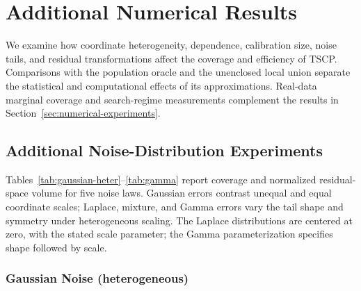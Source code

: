 
\begingroup
\color{blue}
\setlength{\emergencystretch}{2em}

\section{Additional Numerical Results}
\label{app:additional-experiments}

We examine how coordinate heterogeneity, dependence, calibration size, noise
tails, and residual transformations affect the coverage and efficiency of
TSCP. Comparisons with the population oracle and the unenclosed local union
separate the statistical and computational effects of its approximations.
Real-data marginal coverage and search-regime measurements complement the
results in Section~\ref{sec:numerical-experiments}.

\subsection{Additional Noise-Distribution Experiments}
\label{app:additional-distribution-experiments}
\label{app:simulations}

Tables~\ref{tab:gaussian-heter}--\ref{tab:gamma} report coverage and
normalized residual-space volume for five noise laws. Gaussian errors
contrast unequal and equal coordinate scales; Laplace, mixture, and Gamma
errors vary the tail shape and symmetry under heterogeneous scaling.
The Laplace distributions are centered at zero, with the stated scale
parameter; the Gamma parameterization specifies shape followed by scale.

\subsubsection*{Gaussian Noise (heterogeneous)}

\begin{table}[H]
    \centering
    
    \caption{Performance of the proposed TSCP method and alternative conformal prediction approaches on simulated data with $d=10$ outcome variables, as in Figure~\ref{fig:gaussian-heter}. All results are averaged over $200$ trials with their one standard deviation reported in parenthesis.  
    The target coverage level is $0.9$. Coverage below this target is highlighted in \textcolor{red}{red}. For volume, lower is better. Smallest volume size (among those with valid theoretical coverage) is highlighted in \textbf{bold}. TSCP yields the tightest volume while maintaining valid coverage.}
    \label{tab:gaussian-heter}
\end{table}

